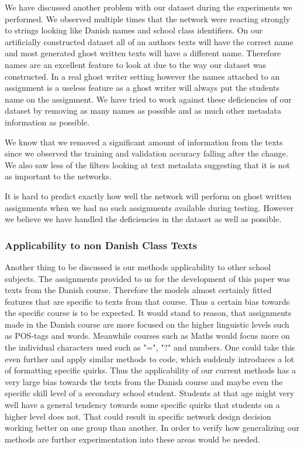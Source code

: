 We have discussed another problem with our dataset during the experiments we
performed. We observed multiple times that the network were reacting strongly
to strings looking like Danish names and school class identifiers. On our
artificially constructed dataset all of an authors texts will have the correct
name and most generated ghost written texts will have a different name.
Therefore names are an excellent feature to look at due to the way our dataset
was constructed. In a real ghost writer setting however the names attached to an
assignment is a useless feature as a ghost writer will always put the students
name on the assignment. We have tried to work against these deficiencies of
our dataset by removing as many names as possible and as much other metadata
information as possible.

We know that we removed a significant amount of information from the texts since
we observed the training and validation accuracy falling after the change. We
also saw less of the filters looking at text metadata suggesting that it is not
as important to the networks.

It is hard to predict exactly how well the network will perform on ghost written
assignments when we had no such assignments available during testing. However we
believe we have handled the deficiencies in the dataset as well as possible.


\subsubsection{Applicability to non Danish Class Texts}

Another thing to be discussed is our methods applicability to other school
subjects. The assignments provided to us for the development of this paper was
texts from the Danish course. Therefore the models almost certainly fitted
features that are specific to texts from that course. Thus a certain bias
towards the specific course is to be expected. It would stand to reason, that
assignments made in the Danish course are more focused on the higher linguistic
levels such as \gls{POS}-tags and words. Meanwhile courses such as Maths would
focus more on the individual characters used such as "=", "?" and numbers. One
could take this even further and apply similar methods to code, which suddenly
introduces a lot of formatting specific quirks. Thus the applicability of our
current methods has a very large bias towards the texts from the Danish course
and maybe even the specific skill level of a secondary school student. Students
at that age might very well have a general tendency towards some specific quirks
that students on a higher level does not. That could result in specific network
design decision working better on one group than another. In order to verify how
generalizing our methods are further experimentation into these areas would be
needed.

